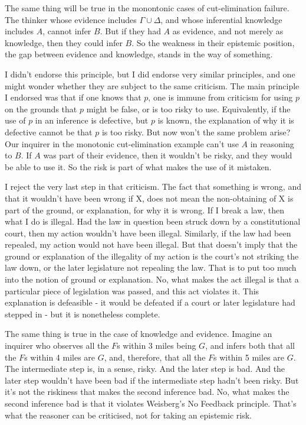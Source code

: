 \documentclass[11pt,]{book}
\begin{document}
The same thing will be true in the monontonic cases of cut-elimination failure. The thinker whose evidence includes \(\Gamma \cup \Delta\), and whose inferential knowledge includes \(A\), cannot infer \(B\). But if they had \(A\) as evidence, and not merely as knowledge, then they could infer \(B\). So the weakness in their epistemic position, the gap between evidence and knowledge, stands in the way of something.

I didn't endorse this principle, but I did endorse very similar principles, and one might wonder whether they are subject to the same criticism. The main principle I endorsed was that if one knows that \(p\), one is immune from criticism for using \(p\) on the grounds that \(p\) might be false, or is too risky to use. Equivalently, if the use of \(p\) in an inference is defective, but \(p\) is known, the explanation of why it is defective cannot be that \(p\) is too risky. But now won't the same problem arise? Our inquirer in the monotonic cut-elimination example can't use \(A\) in reasoning to \(B\). If \(A\) was part of their evidence, then it wouldn't be risky, and they would be able to use it. So the risk is part of what makes the use of it mistaken.

I reject the very last step in that criticism. The fact that something is wrong, and that it wouldn't have been wrong if X, does not mean the non-obtaining of X is part of the ground, or explanation, for why it is wrong. If I break a law, then what I do is illegal. Had the law in question been struck down by a constitutional court, then my action wouldn't have been illegal. Similarly, if the law had been repealed, my action would not have been illegal. But that doesn't imply that the ground or explanation of the illegality of my action is the court's not striking the law down, or the later legislature not repealing the law. That is to put too much into the notion of ground or explanation. No, what makes the act illegal is that a particular piece of legislation was passed, and this act violates it. This explanation is defeasible - it would be defeated if a court or later legislature had stepped in - but it is nonetheless complete.

The same thing is true in the case of knowledge and evidence. Imagine an inquirer who observes all the \(F\)s within 3 miles being \(G\), and infers both that all the \(F\)s within 4 miles are \(G\), and, therefore, that all the \(F\)s within 5 miles are \(G\). The intermediate step is, in a sense, risky. And the later step is bad. And the later step wouldn't have been bad if the intermediate step hadn't been risky. But it's not the riskiness that makes the second inference bad. No, what makes the second inference bad is that it violates Weisberg's No Feedback principle. That's what the reasoner can be criticised, not for taking an epistemic risk.
\end{document}

